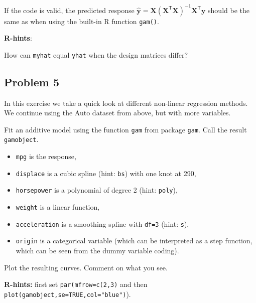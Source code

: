 \documentclass[]{article}
\newenvironment{Shaded}{\begin{snugshade}}{\end{snugshade}}
\newcommand{\CommentTok}[1]{\textcolor[rgb]{0.56,0.35,0.01}{\textit{#1}}}
\newcommand{\DataTypeTok}[1]{\textcolor[rgb]{0.13,0.29,0.53}{#1}}
\newcommand{\DecValTok}[1]{\textcolor[rgb]{0.00,0.00,0.81}{#1}}
\newcommand{\KeywordTok}[1]{\textcolor[rgb]{0.13,0.29,0.53}{\textbf{#1}}}
\newcommand{\NormalTok}[1]{#1}
\newcommand{\OperatorTok}[1]{\textcolor[rgb]{0.81,0.36,0.00}{\textbf{#1}}}
\newcommand{\StringTok}[1]{\textcolor[rgb]{0.31,0.60,0.02}{#1}}
\providecommand{\tightlist}{%
  \setlength{\itemsep}{0pt}\setlength{\parskip}{0pt}}
\begin{document}
If the code is valid, the predicted response
\(\hat{\mathbf y} = \mathbf X(\mathbf X^\mathsf{T} \mathbf X)^{-1} \mathbf X^\mathsf{T} \mathbf y\)
should be the same as when using the built-in R function \texttt{gam()}.

\textbf{R-hints}:

\begin{Shaded}
\end{Shaded}

How can \texttt{myhat} equal \texttt{yhat} when the design matrices
differ?

\hypertarget{problem-5}{%
\subsection{Problem 5}\label{problem-5}}

In this exercise we take a quick look at different non-linear regression
methods. We continue using the Auto dataset from above, but with more
variables.

Fit an additive model using the function \texttt{gam} from package
\texttt{gam}. Call the result \texttt{gamobject}.

\begin{itemize}
\tightlist
\item
  \texttt{mpg} is the response,
\item
  \texttt{displace} is a cubic spline (hint: \texttt{bs}) with one knot
  at 290,
\item
  \texttt{horsepower} is a polynomial of degree 2 (hint: \texttt{poly}),
\item
  \texttt{weight} is a linear function,
\item
  \texttt{acceleration} is a smoothing spline with \texttt{df=3} (hint:
  \texttt{s}),
\item
  \texttt{origin} is a categorical variable (which can be interpreted as
  a step function, which can be seen from the dummy variable coding).
\end{itemize}

Plot the resulting curves. Comment on what you see.

\textbf{R-hints:} first set \texttt{par(mfrow=c(2,3)} and then
\texttt{plot(gamobject,se=TRUE,col="blue")}).
\end{document}
